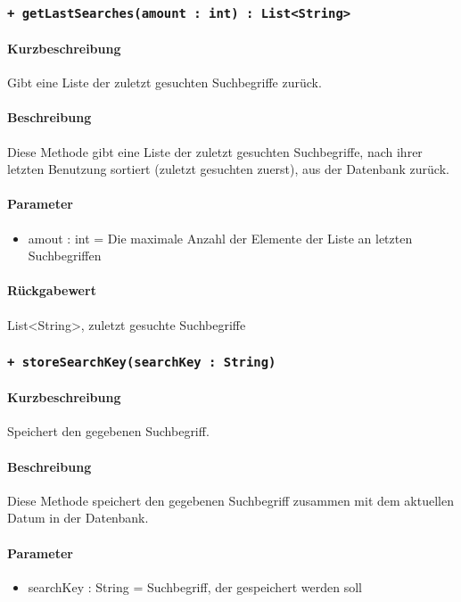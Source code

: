 \subsubsection{\texttt{+ getLastSearches(amount : int) : List<String>}}%
\paragraph*{Kurzbeschreibung}
Gibt eine Liste der zuletzt gesuchten Suchbegriffe zurück.
\paragraph*{Beschreibung}
Diese Methode gibt eine Liste der zuletzt gesuchten Suchbegriffe, nach ihrer letzten Benutzung sortiert (zuletzt gesuchten zuerst), aus der Datenbank zurück.
\paragraph*{Parameter}
\begin{itemize}
    \item amout : int = Die maximale Anzahl der Elemente der Liste an letzten Suchbegriffen
\end{itemize}
\paragraph*{Rückgabewert}
List<String>, zuletzt gesuchte Suchbegriffe

\subsubsection{\texttt{+ storeSearchKey(searchKey : String)}}%
\paragraph*{Kurzbeschreibung}
Speichert den gegebenen Suchbegriff.
\paragraph*{Beschreibung}
Diese Methode speichert den gegebenen Suchbegriff zusammen mit dem aktuellen Datum in der Datenbank.
\paragraph*{Parameter}
\begin{itemize}
    \item searchKey : String = Suchbegriff, der gespeichert werden soll
\end{itemize}

